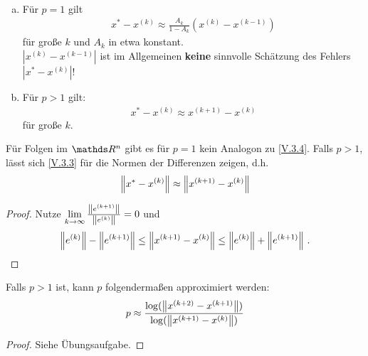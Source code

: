 \begin{Fole}~
	\begin{enumerate}[a)]
		\item Für $p=1$ gilt
		\begin{gather}
		x^{*}-x^{(k)} \approx \frac{A_k}{1-A_k}(x^{(k)}-x^{(k-1)})
		\label{V.3.4}
		\end{gather}
		für große $k$ und $A_k$ in etwa konstant. \\
		$|x^{(k)}-x^{(k-1)}|$ ist im Allgemeinen \textbf{keine} sinnvolle Schätzung
		des Fehlers $|x^{*}-x^{(k)}|$!
		\item Für $p>1$ gilt:
		\begin{gather}
		x^{*}-x^{(k)} \approx x^{(k+1)}-x^{(k)}
		\label{V.3.5}
		\end{gather}
		für große $k$.
	\end{enumerate}
\end{Fole}


\begin{Beme}
	Für Folgen im $\R^n$ gibt es für $p=1$ kein Analogon zu \eqref{V.3.4}.
	Falls $p>1$, lässt sich \eqref{V.3.3} für die Normen der Differenzen zeigen,
	d.h.
	\begin{gather}
	\left\| x^{*}-x^{(k)} \right\| \approx \left\| x^{(k+1)}-x^{(k)} \right\|
	\label{V.3.6}
	\end{gather}
	
	\begin{proof}
		Nutze $\lim\limits_{k\rightarrow\infty} \frac{\left\| e^{(k+1)} \right\|}{\left\| e^{(k)} \right\|} =0$
		und 
		\begin{gather*}
		\left\| e^{(k)} \right\|-\left\| e^{(k+1)} \right\|\leq \left\| x^{(k+1)}-x^{(k)} \right\| \leq \left\| e^{(k)} \right\|+\left\| e^{(k+1)} \right\| \, .
		\end{gather*}
	\end{proof}
\end{Beme}


\begin{Fole}
	Falls $p>1$ ist, kann $p$ folgendermaßen approximiert werden:
	\begin{gather*}
	p \approx \frac{\log(\left\| x^{(k+2)}-x^{(k+1)} \right\|)}{\log(\left\| x^{(k+1)}-x^{(k)} \right\|)}
	\end{gather*}
\end{Fole}

\begin{proof}
	Siehe Übungsaufgabe.
\end{proof}

